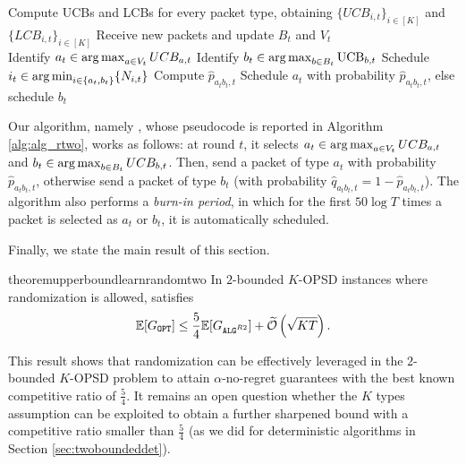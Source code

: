 \begin{algorithm}[t!]
\caption{\algrtwo}
\label{alg:alg_rtwo}
\small
\begin{algorithmic}[1]
        \STATE Compute UCBs and LCBs for every packet type, obtaining $\{UCB_{i,t}\}_{i\in [K]}$ and $\{LCB_{i,t}\}_{i\in [K]}$
        \STATE Receive new packets and update $B_t$ and $V_t$ \\
        \STATE Identify $a_t \in \operatorname*{arg\,max}_{a \in  V_t}UCB_{a,t}$ 
        \STATE Identify $b_t \in \operatorname*{arg\,max}_{b \in B_t} \mathrm{UCB}_{b,t}$
            \STATE Schedule $i_t \in \operatorname*{arg\,min}_{i \in \{a_t,b_t\}} \{N_{i,t}\}$
        \ELSE
            \STATE Compute $\widehat{p}_{a_t b_t, t}$
            \STATE Schedule $a_t$ with probability $\widehat{p}_{a_t b_t, t}$, else schedule $b_t$
        \ENDIF
    \ENDFOR
\end{algorithmic}
\end{algorithm}
Our algorithm, namely \algrtwo, whose pseudocode is reported in Algorithm \ref{alg:alg_rtwo}, works as follows: at round $t$, it selects $a_t \in \operatorname*{arg\,max}_{a \in V_t} UCB_{a,t}$ and $b_t \in \operatorname*{arg\,max}_{b \in B_t} UCB_{b,t}$. Then, send a packet of type $a_t$ with probability $\widehat{p}_{a_t b_t, t}$, otherwise send a packet of type $b_t$ (with probability $\widehat{q}_{a_t b_t, t} = 1-\widehat{p}_{a_t b_t, t}$). 
The algorithm also performs a \textit{burn-in period}, in which for the first $50\log T$ times a packet is selected as $a_t$ or $b_t$, it is automatically scheduled.

Finally, we state the main result of this section.
\begin{restatable}{theorem}{upperboundlearnrandomtwo}
\label{thr:upperboundrtwo}
    In $2$-bounded $K$-OPSD instances where randomization is allowed, \algrtwo satisfies
    \begin{equation}
        \mathbb{E}[\Gopt] \le \frac{5}{4} \mathbb{E}[\Galgrtwo] + \widetilde{\mathcal{O}}\left(\sqrt{KT}\right).
    \end{equation}
\end{restatable}
This result shows that randomization can be effectively leveraged in the $2$-bounded $K$-OPSD problem to attain $\alpha$-no-regret guarantees with the best known competitive ratio of $\frac{5}{4}$. It remains an open question whether the $K$ types assumption can be exploited to obtain a further sharpened bound with a competitive ratio smaller than $\frac{5}{4}$ (as we did for deterministic algorithms in Section \ref{sec:twoboundeddet}). 

